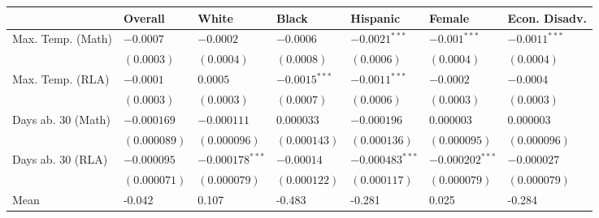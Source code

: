 
\begin{tabular}{lllllll}
\toprule
  & Overall & White & Black & Hispanic & Female & Econ. Disadv.\\
\midrule
Max. Temp. (Math) & $-0.0007$ & $-0.0002$ & $-0.0006$ & $-0.0021^{***}$ & $-0.001^{***}$ & $-0.0011^{***}$\\
 & $(0.0003)$ & $(0.0004)$ & $(0.0008)$ & $(0.0006)$ & $(0.0004)$ & $(0.0004)$\\
\addlinespace
Max. Temp. (RLA) & $-0.0001$ & $0.0005$ & $-0.0015^{***}$ & $-0.0011^{***}$ & $-0.0002$ & $-0.0004$\\
 & $(0.0003)$ & $(0.0003)$ & $(0.0007)$ & $(0.0006)$ & $(0.0003)$ & $(0.0003)$\\
\addlinespace
Days ab. 30 (Math) & $-0.000169$ & $-0.000111$ & $0.000033$ & $-0.000196$ & $0.000003$ & $0.000003$\\
 & $(0.000089)$ & $(0.000096)$ & $(0.000143)$ & $(0.000136)$ & $(0.000095)$ & $(0.000096)$\\
\addlinespace
Days ab. 30 (RLA) & $-0.000095$ & $-0.000178^{***}$ & $-0.00014$ & $-0.000483^{***}$ & $-0.000202^{***}$ & $-0.000027$\\
 & $(0.000071)$ & $(0.000079)$ & $(0.000122)$ & $(0.000117)$ & $(0.000079)$ & $(0.000079)$\\
\addlinespace
Mean & -0.042 & 0.107 & -0.483 & -0.281 & 0.025 & -0.284\\
\bottomrule
\end{tabular}
